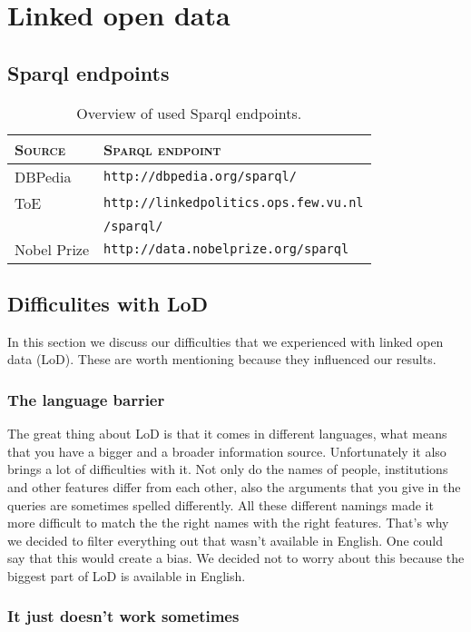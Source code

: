 \section{Linked open data}
\label{sec:lod}
\subsection{Sparql endpoints}
\begin{table}[H]
\centering
\begin{tabular}{l|l}
	\textbf{\textsc{Source}} & \textbf{\textsc{Sparql endpoint}} \\ \hline
	\rule{0pt}{4mm}DBPedia & \texttt{http://dbpedia.org/sparql/} \\
	ToE &  \texttt{http://linkedpolitics.ops.few.vu.nl} \\
	& \texttt{/sparql/} \\
	Nobel Prize & \texttt{http://data.nobelprize.org/sparql}
\end{tabular}
\caption{Overview of used Sparql endpoints.}
\end{table}
\subsection{Difficulites with LoD}
In this section we discuss our difficulties that we experienced with linked open data (LoD). These are worth mentioning because they influenced our results.

\subsubsection{The language barrier}
The great thing about LoD is that it comes in different languages, what means that you have a bigger and a broader information source.
Unfortunately it also brings a lot of difficulties with it.
Not only do the names of people, institutions and other features differ from each other, also the arguments that you give in the queries are sometimes spelled differently.
All these different namings made it more difficult to match the the right names with the right features.
That's why we decided to filter everything out that wasn't available in English. One could say that this would create a bias. We decided not to worry about this because the biggest part of LoD is available in English.

\subsubsection{It just doesn't work sometimes}

